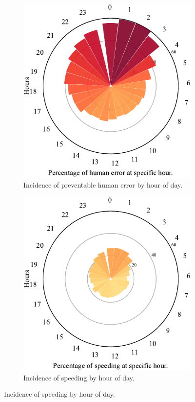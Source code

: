\documentclass{article}
\theoremstyle{plain}
\theoremstyle{definition}
\theoremstyle{remark}
\begin{document}
\begin{figure}[ht]
	\vskip 0.2in
	\centering
		\begin{subfigure}[ht]{0.49\columnwidth}
			\includegraphics[width=\columnwidth]{plots/err-time-total}
			\caption{Incidence of preventable human error by hour of day.}
			\label{fig:err-time-overall}
		\end{subfigure}
		\hfill
		\begin{subfigure}[ht]{0.49\columnwidth}
			\includegraphics[width=\columnwidth]{plots/err-time-speeding}
			\caption{Incidence of speeding by hour of day.}
			\label{fig:err-time-speeding}
		\end{subfigure}


\end{figure}
\end{document}
